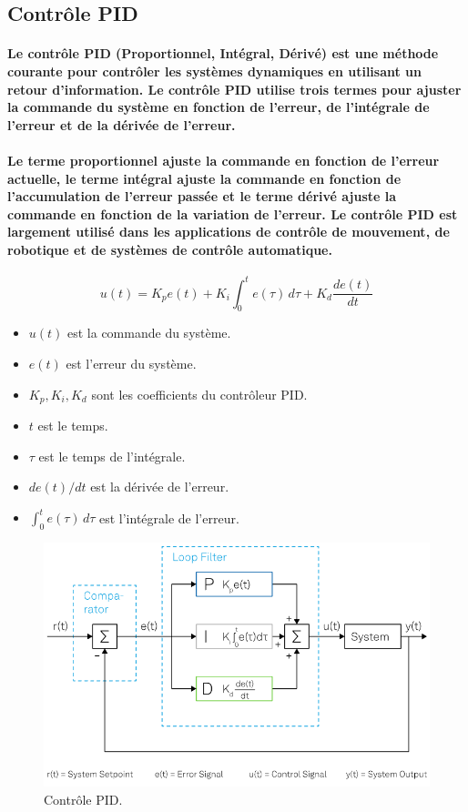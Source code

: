\newpage

\subsection{Contrôle PID}

\paragraph{Le contrôle PID (Proportionnel, Intégral, Dérivé) est une méthode courante pour contrôler les systèmes dynamiques en utilisant un retour d'information. Le contrôle PID utilise trois termes pour ajuster la commande du système en fonction de l'erreur, de l'intégrale de l'erreur et de la dérivée de l'erreur.}

\paragraph{Le terme proportionnel ajuste la commande en fonction de l'erreur actuelle, le terme intégral ajuste la commande en fonction de l'accumulation de l'erreur passée et le terme dérivé ajuste la commande en fonction de la variation de l'erreur. Le contrôle PID est largement utilisé dans les applications de contrôle de mouvement, de robotique et de systèmes de contrôle automatique.}

\begin{equation}
	u(t) = K_p e(t) + K_i \int_{0}^{t} e(\tau) \,d\tau + K_d \frac{de(t)}{dt}
\end{equation}

\begin{itemize}
	\item $u(t)$ est la commande du système.
	\item $e(t)$ est l'erreur du système.
	\item $K_p, K_i, K_d$ sont les coefficients du contrôleur PID.
	\item $t$ est le temps.
	\item $\tau$ est le temps de l'intégrale.
	\item $de(t)/dt$ est la dérivée de l'erreur.
	\item $\int_{0}^{t} e(\tau) \,d\tau$ est l'intégrale de l'erreur.
\end{itemize}

\begin{figure}[!htpb]
	\centering
	\includegraphics[width=\linewidth]{Figures/pid.png}
	\caption[Contrôle PID]{Contrôle PID.}	
\end{figure}

